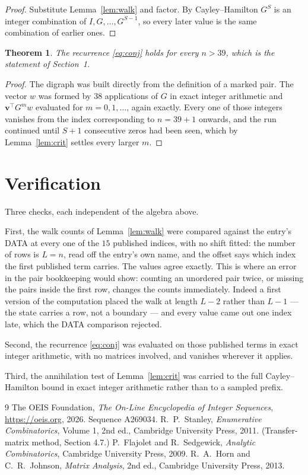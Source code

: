\documentclass[11pt,a4paper]{article}
\theoremstyle{plain}
\newtheorem{theorem}{Theorem}
\theoremstyle{definition}
\begin{document}
\begin{proof}
Substitute Lemma~\ref{lem:walk} and factor. By Cayley--Hamilton $G^{S}$ is an integer
combination of $I,G,\dots,G^{S-1}$, so every later value is the same combination of earlier
ones.
\end{proof}

\begin{theorem}
The recurrence \eqref{eq:conj} holds for every $n>39$, which is the statement of
Section~1.
\end{theorem}

\begin{proof}
The digraph was built directly from the definition of a marked pair. The vector $w$ was
formed by $38$ applications of $G$ in exact integer arithmetic and
$\mathbf{v}^{\!\top}G^{m}w$ evaluated for $m=0,1,\dots$, again exactly. Every one of
those integers vanishes from the index corresponding to $n=39+1$ onwards, and the run
continued until $S+1$ consecutive zeros had been seen, which by Lemma~\ref{lem:crit}
settles every larger $m$.
\end{proof}

\section{Verification}

Three checks, each independent of the algebra above.

First, the walk counts of Lemma~\ref{lem:walk} were compared against the entry's DATA at
every one of the $15$ published indices, with no shift fitted: the number of rows is
$L=n$, read off the entry's own name, and the offset says which index the first
published term carries. The values agree exactly. This is where an error in the pair
bookkeeping would show: counting an unordered pair twice, or missing the pairs inside the
first row, changes the counts immediately. Indeed a first version of the computation
placed the walk at length $L-2$ rather than $L-1$ --- the state carries a row, not a
boundary --- and every value came out one index late, which the DATA comparison rejected.

Second, the recurrence \eqref{eq:conj} was evaluated on those published terms in exact
integer arithmetic, with no matrices involved, and vanishes wherever it applies.

Third, the annihilation test of Lemma~\ref{lem:crit} was carried to the full
Cayley--Hamilton bound in exact integer arithmetic rather than to a sampled prefix.

\begin{thebibliography}{9}
 The OEIS Foundation, \emph{The On-Line Encyclopedia of Integer
Sequences}, \url{https://oeis.org}, 2026. Sequence A269034.
 R.~P.~Stanley, \emph{Enumerative Combinatorics}, Volume 1, 2nd ed.,
Cambridge University Press, 2011. (Transfer-matrix method, Section 4.7.)
 P.~Flajolet and R.~Sedgewick, \emph{Analytic Combinatorics}, Cambridge
University Press, 2009.
 R.~A.~Horn and C.~R.~Johnson, \emph{Matrix Analysis}, 2nd ed., Cambridge
University Press, 2013.
\end{thebibliography}
\end{document}
